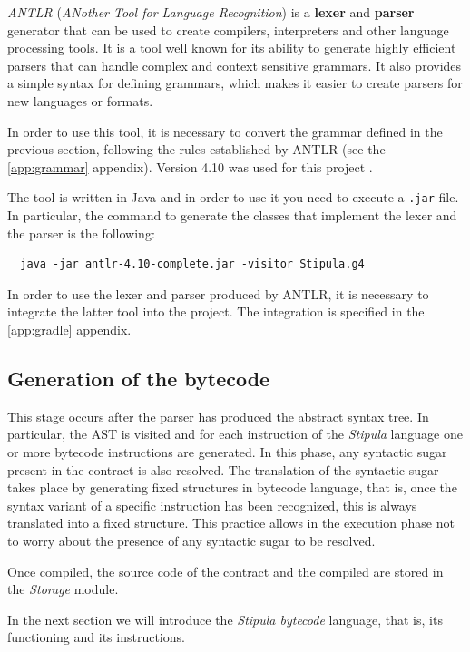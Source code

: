 \textit{ANTLR} (\textit{ANother Tool for Language Recognition}) is a \textbf{lexer} and \textbf{parser} 
generator that can be used to create compilers, interpreters and other language processing tools. It is a 
tool well known for its ability to generate highly efficient parsers that can handle complex and context 
sensitive grammars. It also provides a simple syntax for defining grammars, which makes it easier to 
create parsers for new languages or formats.

In order to use this tool, it is necessary to convert the grammar defined in the previous section, 
following the rules established by ANTLR (see the \ref{app:grammar} appendix). Version 4.10 was used for 
this project \autocite{site:antlr-version}. 

The tool is written in Java and in order to use it you need to execute a \verb|.jar| file. In particular, 
the command to generate the classes that implement the lexer and the parser is the following:
\begin{Verbatim}
  java -jar antlr-4.10-complete.jar -visitor Stipula.g4
\end{Verbatim}

In order to use the lexer and parser produced by ANTLR, it is necessary to integrate the latter tool into 
the project. The integration is specified in the \ref{app:gradle} appendix.

\subsection{Generation of the bytecode}

This stage occurs after the parser has produced the abstract syntax tree. In particular, the AST is 
visited and for each instruction of the \textit{Stipula} language one or more bytecode instructions are 
generated. In this phase, any syntactic sugar present in the contract is also resolved. The translation 
of the syntactic sugar takes place by generating fixed structures in bytecode language, that is, once the 
syntax variant of a specific instruction has been recognized, this is always translated into a fixed 
structure. This practice allows in the execution phase not to worry about the presence of any syntactic 
sugar to be resolved.

Once compiled, the source code of the contract and the compiled are stored in the \textit{Storage} module.

In the next section we will introduce the \textit{Stipula bytecode} language, that is, its functioning and 
its instructions.

